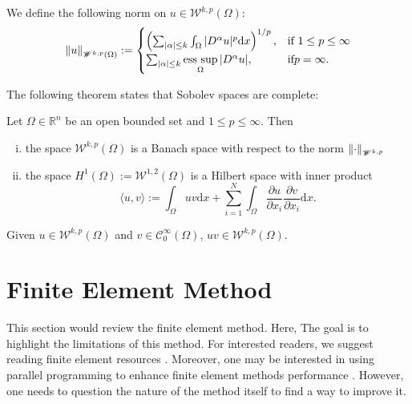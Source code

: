 \begin{defn}
	We define the following norm on $u \in  \mathscr{W}^{k,p}(\Omega)$:
	\begin{equation*}
		\left\lVert u\right\rVert_{\mathscr{W}^{k,p}(\Omega)} := 
		\begin{cases}
			\left( \sum_{\vert\alpha\vert\leq k} \int_{\Omega} \vert D^\alpha u\vert^p \text{d}x \right)^{1/p},& \text{if } 1 \leq p \leq \infty\\
			\sum_{\vert\alpha\vert\leq k} \mathop{\mathrm{ess~sup}}\limits_{\Omega}\vert D^\alpha u\vert,& \text{if} p = \infty.
		\end{cases}
	\end{equation*}
\end{defn}
The following theorem states that Sobolev spaces are complete:
\begin{thm}
	Let $\Omega \in \mathbb{R}^n$ be an open bounded set
and $1 \leq p \leq \infty$. Then
	\begin{enumerate}[i.]
		\item the space $\mathscr{W}^{k,p}(\Omega)$ is a Banach space with respect to the norm $\left\lVert\cdot\right\rVert_{\mathscr{W}^{k,p}}$
		\item the space $H^1(\Omega) := \mathscr{W}^{1,2}(\Omega)$ is a Hilbert space with inner product
		\begin{equation*}
			\langle u,v \rangle := \int_{\Omega} uv \text{d}x + \sum_{i=1}^{N}\int_{\Omega} \frac{\partial u}{\partial x_i} \frac{\partial v}{\partial x_i} \text{d}x.
		\end{equation*}
	\end{enumerate}

\end{thm}
\begin{lemma}
	Given $u \in \mathscr{W}^{k,p}(\Omega)$ and $v \in \mathscr{C}_{0}^{\infty} (\Omega)$, $uv \in \mathscr{W}^{k,p}(\Omega)$.
\end{lemma}
\section{Finite Element Method}
\label{sec:finite_element_method}
This section would review the finite element method. Here, The goal is to highlight the limitations of this method. For interested readers, we suggest reading finite element resources \cite{suli2012lecture, johnson2012numerical}. Moreover, one may be interested in using parallel programming to enhance finite element methods performance \cite{douglas2003tutorial}. However, one needs to question the nature of the method itself to find a way to improve it.

